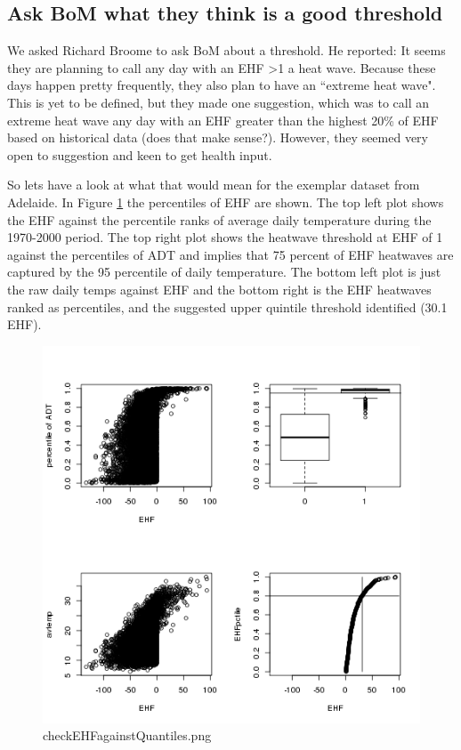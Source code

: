 \documentclass[a4paper]{article}
\begin{document}
\subsection{Ask BoM what they think is a good threshold}

We asked Richard Broome to ask BoM about a threshold.  He reported: It seems they are planning to call any day with an EHF >1 a heat wave. Because these days happen pretty frequently, they also plan to have an ``extreme heat wave".  This is yet to be defined, but they made one suggestion, which was to call an extreme heat wave any day with an EHF greater than the highest 20\% of EHF based on historical data (does that make sense?). However, they seemed very open to suggestion and keen to get health input.
 
 So lets have a look at what that would mean for the exemplar dataset from Adelaide.  In Figure \ref{fig:checkEHFagainstQuantiles.png}  the percentiles of EHF are shown.  The top left plot shows the EHF against the percentile ranks of average daily temperature during the 1970-2000 period.  The top right plot shows the heatwave threshold at EHF of 1 against the percentiles of ADT and implies that 75 percent of EHF heatwaves are captured by the 95 percentile of daily temperature. The bottom left plot is just the raw daily temps against EHF and the bottom right is the EHF heatwaves ranked as percentiles, and the suggested upper quintile threshold identified (30.1 EHF).
 
 

\begin{figure}[!h]
\centering
\includegraphics[width=\textwidth]{checkEHFagainstQuantiles.png}
\caption{checkEHFagainstQuantiles.png}
\label{fig:checkEHFagainstQuantiles.png}
\end{figure}
\clearpage
\end{document}
